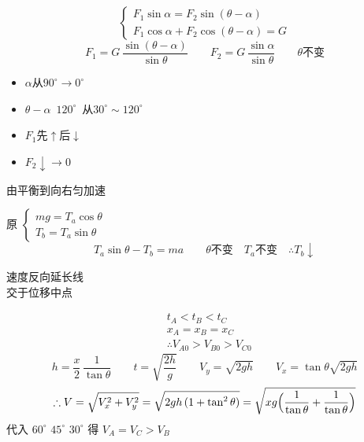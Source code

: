 \begin{problem}[1]
\begin{solution}
\[ \begin{cases} F_1\sin\alpha=F_2\sin(\theta-\alpha)\\ F_1\cos\alpha+F_2\cos(\theta-\alpha)=G \end{cases} \]
\[ F_1=G\,\frac{\sin(\theta-\alpha)}{\sin\theta}\qquad F_2=G\,\frac{\sin\alpha}{\sin\theta}\qquad\theta\text{不变} \]
\begin{itemize}
\item $\alpha$从$90^\circ\to0^\circ$
\item $\theta-\alpha$\ $120^\circ$\ 从$30^\circ\sim120^\circ$ %
\item $F_1$先$\uparrow$后$\downarrow$
\item $F_2\downarrow\to0$
\end{itemize}
\end{solution}
\end{problem}
\begin{problem}[2]
由平衡到向右匀加速
\begin{solution}
原
$\begin{cases} mg=T_a\cos\theta\\ T_b=T_a\sin\theta \end{cases}$
\[ T_a\sin\theta-T_b=ma\qquad\theta\text{不变}\quad T_a\text{不变}\quad\therefore T_b\downarrow \]
\end{solution}
\end{problem}
\begin{problem}[3、平抛]
速度反向延长线\\交于位移中点
\begin{solution}
\begin{align*}
&t_A<t_B<t_C\\
&x_A=x_B=x_C\\
&\therefore V_{A0}>V_{B0}>V_{C0}
\end{align*}
\[ h=\frac{x}{2}\,\frac{1}{\tan\theta}\qquad t=\sqrt{\frac{2h}{g}}\qquad V_y=\sqrt{2gh}\qquad V_x=\tan\theta\sqrt{2gh} \]
\[ \therefore V=\sqrt{V_x^2+V_y^2}=\sqrt{2gh\,(1+\tan^2\theta)}=\sqrt{xg\Bigl(\frac{1}{\tan\theta}+\frac{1}{\tan\theta}\Bigr)} \] %
代入 $60^\circ$ $45^\circ$ $30^\circ$ 得 $V_A=V_C>V_B$
\end{solution}
\end{problem}
